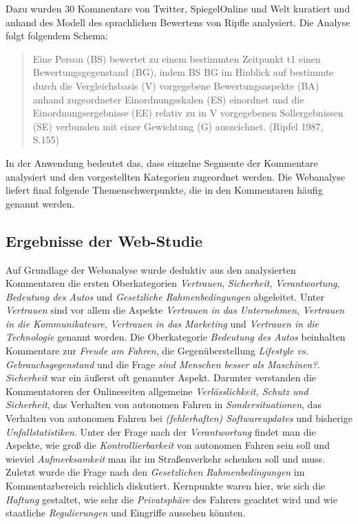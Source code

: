 \documentclass[12pt]{article}
\begin{document}
Dazu wurden 30 Kommentare von Twitter, SpiegelOnline und Welt kuratiert und anhand des Modell des sprachlichen Bewertens von Ripfle analysiert. Die Analyse folgt folgendem Schema:

\begin{quote}
  Eine Person (BS) bewertet zu einem bestimmten Zeitpunkt t1 einen Bewertungsgegenstand (BG), indem BS BG im Hinblick auf bestimmte durch die Vergleichsbasis (V) vorgegebene Bewertungsaspekte (BA) anhand zugeordneter Einordnungsskalen (ES) einordnet und die Einordnungsergebnisse (EE) relativ zu in V vorgegebenen Sollergebnissen (SE) verbunden mit einer Gewichtung (G) auszeichnet. (Ripfel 1987, S.155)
\end{quote}

In der Anwendung bedeutet das, dass einzelne Segmente der Kommentare analysiert und den vorgestellten Kategorien zugeordnet werden. Die Webanalyse liefert final folgende Themenschwerpunkte, die in den Kommentaren häufig genannt werden.

\subsection{Ergebnisse der Web-Studie}

Auf Grundlage der Webanalyse wurde deduktiv aus den analysierten Kommentaren die ersten Oberkategorien \emph{Vertrauen}, \emph{Sicherheit}, \emph{Verantwortung}, \emph{Bedeutung des Autos} und \emph{Gesetzliche Rahmenbedingungen} abgeleitet.
Unter \emph{Vertrauen} sind vor allem die Aspekte \emph{Vertrauen in das Unternehmen}, \emph{Vertrauen in die Kommunikateure}, \emph{Vertrauen in das Marketing} und \emph{Vertrauen in die Technologie} genannt worden.
Die Oberkategorie \emph{Bedeutung des Autos} beinhalten Kommentare zur \emph{Freude am Fahren}, die Gegenüberstellung \emph{Lifestyle vs. Gebrauchsgegenstand} und die Frage \emph{sind Menschen besser als Maschinen?}.
\emph{Sicherheit} war ein äußerst oft genannter Aspekt. Darunter verstanden die Kommentatoren der Onlineseiten allgemeine \emph{Verlässlichkeit, Schutz und Sicherheit}, das Verhalten von autonomen Fahren in \emph{Sondersituationen}, das Verhalten von autonomen Fahren bei \emph{(fehlerhaften) Softwareupdates} und bisherige \emph{Unfallstatistiken}.
Unter der Frage nach der \emph{Verantwortung} findet man die Aspekte, wie groß die \emph{Kontrollierbarkeit} von autonomen Fahren sein soll und wieviel \emph{Aufmerksamkeit} man ihr im Straßenverkehr schenken soll und muss.
Zuletzt wurde die Frage nach den \emph{Gesetzlichen Rahmenbedingungen} im Kommentarbereich reichlich diskutiert. Kernpunkte waren hier, wie sich die \emph{Haftung} gestaltet, wie sehr die \emph{Privatsphäre} des Fahrers geachtet wird und wie staatliche \emph{Regulierungen} und Eingriffe aussehen könnten.
\end{document}
